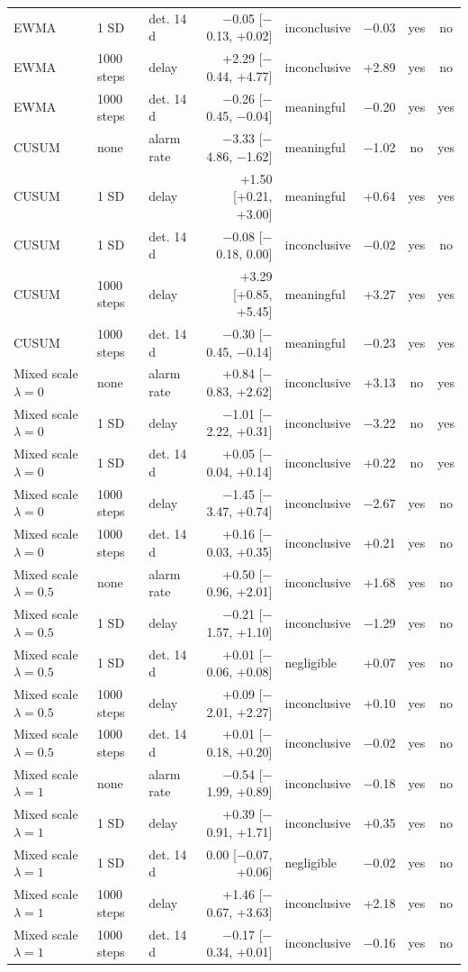 {\begin{longtable}{@{}lllrlrcc@{}}
EWMA & 1 SD & det. 14 d & $-$0.05 [$-$0.13, +0.02] & inconclusive & $-$0.03 & yes & no \\
EWMA & 1000 steps & delay & +2.29 [$-$0.44, +4.77] & inconclusive & +2.89 & yes & no \\
EWMA & 1000 steps & det. 14 d & $-$0.26 [$-$0.45, $-$0.04] & meaningful & $-$0.20 & yes & yes \\
CUSUM & none & alarm rate & $-$3.33 [$-$4.86, $-$1.62] & meaningful & $-$1.02 & no & yes \\
CUSUM & 1 SD & delay & +1.50 [+0.21, +3.00] & meaningful & +0.64 & yes & yes \\
CUSUM & 1 SD & det. 14 d & $-$0.08 [$-$0.18, 0.00] & inconclusive & $-$0.02 & yes & no \\
CUSUM & 1000 steps & delay & +3.29 [+0.85, +5.45] & meaningful & +3.27 & yes & yes \\
CUSUM & 1000 steps & det. 14 d & $-$0.30 [$-$0.45, $-$0.14] & meaningful & $-$0.23 & yes & yes \\
Mixed scale $\lambda=0$ & none & alarm rate & +0.84 [$-$0.83, +2.62] & inconclusive & +3.13 & no & yes \\
Mixed scale $\lambda=0$ & 1 SD & delay & $-$1.01 [$-$2.22, +0.31] & inconclusive & $-$3.22 & no & yes \\
Mixed scale $\lambda=0$ & 1 SD & det. 14 d & +0.05 [$-$0.04, +0.14] & inconclusive & +0.22 & no & yes \\
Mixed scale $\lambda=0$ & 1000 steps & delay & $-$1.45 [$-$3.47, +0.74] & inconclusive & $-$2.67 & yes & no \\
Mixed scale $\lambda=0$ & 1000 steps & det. 14 d & +0.16 [$-$0.03, +0.35] & inconclusive & +0.21 & yes & no \\
Mixed scale $\lambda=0.5$ & none & alarm rate & +0.50 [$-$0.96, +2.01] & inconclusive & +1.68 & yes & no \\
Mixed scale $\lambda=0.5$ & 1 SD & delay & $-$0.21 [$-$1.57, +1.10] & inconclusive & $-$1.29 & yes & no \\
Mixed scale $\lambda=0.5$ & 1 SD & det. 14 d & +0.01 [$-$0.06, +0.08] & negligible & +0.07 & yes & no \\
Mixed scale $\lambda=0.5$ & 1000 steps & delay & +0.09 [$-$2.01, +2.27] & inconclusive & +0.10 & yes & no \\
Mixed scale $\lambda=0.5$ & 1000 steps & det. 14 d & +0.01 [$-$0.18, +0.20] & inconclusive & $-$0.02 & yes & no \\
Mixed scale $\lambda=1$ & none & alarm rate & $-$0.54 [$-$1.99, +0.89] & inconclusive & $-$0.18 & yes & no \\
Mixed scale $\lambda=1$ & 1 SD & delay & +0.39 [$-$0.91, +1.71] & inconclusive & +0.35 & yes & no \\
Mixed scale $\lambda=1$ & 1 SD & det. 14 d & 0.00 [$-$0.07, +0.06] & negligible & $-$0.02 & yes & no \\
Mixed scale $\lambda=1$ & 1000 steps & delay & +1.46 [$-$0.67, +3.63] & inconclusive & +2.18 & yes & no \\
Mixed scale $\lambda=1$ & 1000 steps & det. 14 d & $-$0.17 [$-$0.34, +0.01] & inconclusive & $-$0.16 & yes & no \\
\end{longtable}
}
